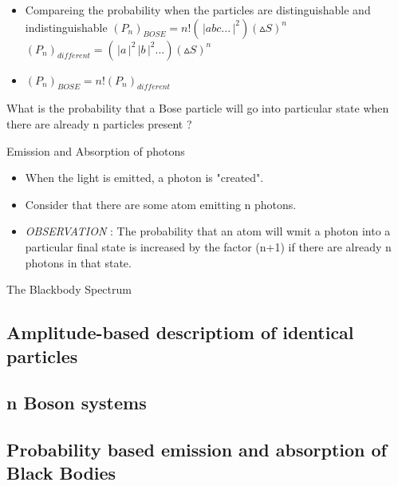\documentclass[aspectratio=169]{beamer}
\begin{document}
\begin{frame}

	\begin{itemize}
	
	\item Compareing the probability when the particles are distinguishable and indistinguishable \newline
	$(P_{n})_{BOSE} = n!\left(\,\Bigr\rvert abc... \,\Bigr\rvert^{2}\right)(\vartriangle S)^{n}$ \newline
	$(P_{n})_{different} = \left(\,\Bigr\rvert a \,\Bigr\rvert^{2}\,\Bigr\rvert b \,\Bigr\rvert^{2}...\right)(\vartriangle S)^{n}$ 
	\item $(P_{n})_{BOSE} = n!(P_{n})_{different}$
	
	\end{itemize}
	
\end{frame}

\begin{frame}

	
	{\large	What is the probability that a Bose particle will go into particular state when there are already n particles present ?}
		
\end{frame}

\begin{frame}{Emission and Absorption of photons}

	\begin{itemize}
	
		\item When the light is emitted, a photon is "created".\newline
		\item Consider that there are some atom emitting n photons. \newline
		\item \textit{OBSERVATION} : The probability that an atom will wmit a photon into a particular final state is increased by the factor (n+1) if there are already n photons in that state.
		
	\end{itemize}
	
\end{frame}

\begin{frame}{The Blackbody Spectrum}

\end{frame}

\subsection{Amplitude-based descriptiom of identical particles}

\subsection{n Boson systems}

\subsection{Probability based emission and absorption of Black Bodies}
\end{document}
